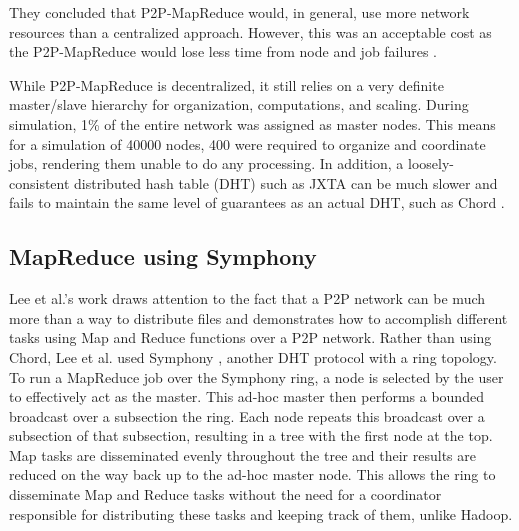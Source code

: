 \documentclass[10pt, conference, compsocconf]{IEEEtran}
\begin{document}
They concluded that P2P-MapReduce would, in general, use more network resources than a centralized approach. However, this was an acceptable cost as the P2P-MapReduce would lose less time from node and job failures \cite{marozzo2012p2p}.

While P2P-MapReduce is decentralized, it still relies on a very definite master/slave hierarchy for organization, computations, and scaling. 
During simulation, 1\% of the entire network was assigned as master nodes. This means for a simulation of 40000 nodes, 400 were required to organize and coordinate jobs, rendering them unable to do any processing.  In addition, a loosely-consistent  distributed hash table (DHT) such as JXTA can be much slower and fails to maintain the same level of guarantees as an actual DHT, such as Chord \cite{5359174}.   



\subsection{MapReduce using Symphony}

Lee et al.'s work \cite{leemap} draws attention to the fact that a P2P network can be much more than a way to distribute files and demonstrates how to accomplish different tasks using Map and Reduce functions over a P2P network.  Rather than using Chord, Lee et al. used Symphony \cite{symphony}, another DHT protocol with a ring topology.  To run a MapReduce job over the Symphony ring, a node is selected by the user to effectively act as the master.  This ad-hoc master then performs a bounded broadcast over a subsection the ring.  Each node repeats this broadcast over a subsection of that subsection, resulting in a tree with the first node at the top.  Map tasks are disseminated evenly throughout the tree and their results are reduced on the way back up to the ad-hoc master node.  This allows the ring to disseminate Map and Reduce tasks without the need for a coordinator responsible for distributing these tasks and keeping track of them, unlike Hadoop.
 
\end{document}
